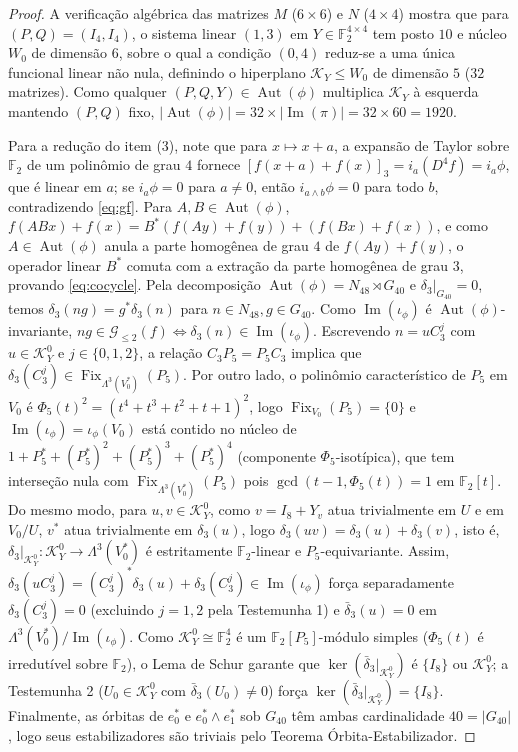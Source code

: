 \documentclass[11pt,a4paper]{article}
\theoremstyle{definition}
\theoremstyle{remark}
\newcommand{\F}{\mathbb{F}_2}
\newcommand{\Aut}{\operatorname{Aut}}
\newcommand{\Fix}{\operatorname{Fix}}
\begin{document}
\begin{proof}
A verificação algébrica das matrizes $M$ ($6\times 6$) e $N$ ($4\times 4$) mostra que para $(P,Q) = (I_4, I_4)$, o sistema linear $(1,3)$ em $Y \in \F^{4\times 4}$ tem posto $10$ e núcleo $W_0$ de dimensão $6$, sobre o qual a condição $(0,4)$ reduz-se a uma única funcional linear não nula, definindo o hiperplano $\mathcal{K}_Y \le W_0$ de dimensão $5$ ($32$ matrizes). Como qualquer $(P,Q,Y) \in \Aut(\phi)$ multiplica $\mathcal{K}_Y$ à esquerda mantendo $(P,Q)$ fixo, $|\Aut(\phi)| = 32 \times |\operatorname{Im}(\pi)| = 32 \times 60 = 1920$.

Para a redução do item (3), note que para $x \mapsto x+a$, a expansão de Taylor sobre $\F$ de um polinômio de grau $4$ fornece $[f(x+a)+f(x)]_3 = i_a(D^4 f) = i_a\phi$, que é linear em $a$; se $i_a\phi = 0$ para $a \neq 0$, então $i_{a\wedge b}\phi = 0$ para todo $b$, contradizendo \eqref{eq:gf}. Para $A,B \in \Aut(\phi)$, $f(ABx)+f(x) = B^*(f(Ay)+f(y)) + (f(Bx)+f(x))$, e como $A \in \Aut(\phi)$ anula a parte homogênea de grau $4$ de $f(Ay)+f(y)$, o operador linear $B^*$ comuta com a extração da parte homogênea de grau $3$, provando \eqref{eq:cocycle}. Pela decomposição $\Aut(\phi) = N_{48} \rtimes G_{40}$ e $\delta_3|_{G_{40}} = 0$, temos $\delta_3(n g) = g^*\delta_3(n)$ para $n \in N_{48}, g \in G_{40}$. Como $\operatorname{Im}(\iota_\phi)$ é $\Aut(\phi)$-invariante, $ng \in \mathcal{G}_{\le 2}(f) \iff \delta_3(n) \in \operatorname{Im}(\iota_\phi)$. Escrevendo $n = u C_3^j$ com $u \in \mathcal{K}_Y^0$ e $j \in \{0,1,2\}$, a relação $C_3 P_5 = P_5 C_3$ implica que $\delta_3(C_3^j) \in \Fix_{\Lambda^3(V_0^*)}(P_5)$. Por outro lado, o polinômio característico de $P_5$ em $V_0$ é $\Phi_5(t)^2 = (t^4+t^3+t^2+t+1)^2$, logo $\Fix_{V_0}(P_5) = \{0\}$ e $\operatorname{Im}(\iota_\phi) = \iota_\phi(V_0)$ está contido no núcleo de $1+P_5^*+(P_5^*)^2+(P_5^*)^3+(P_5^*)^4$ (componente $\Phi_5$-isotípica), que tem interseção nula com $\Fix_{\Lambda^3(V_0^*)}(P_5)$ pois $\gcd(t-1, \Phi_5(t)) = 1$ em $\F[t]$. Do mesmo modo, para $u,v \in \mathcal{K}_Y^0$, como $v = I_8 + Y_v$ atua trivialmente em $U$ e em $V_0/U$, $v^*$ atua trivialmente em $\delta_3(u)$, logo $\delta_3(uv) = \delta_3(u) + \delta_3(v)$, isto é, $\delta_3|_{\mathcal{K}_Y^0} : \mathcal{K}_Y^0 \to \Lambda^3(V_0^*)$ é estritamente $\F$-linear e $P_5$-equivariante. Assim, $\delta_3(u C_3^j) = (C_3^j)^*\delta_3(u) + \delta_3(C_3^j) \in \operatorname{Im}(\iota_\phi)$ força separadamente $\delta_3(C_3^j) = 0$ (excluindo $j=1,2$ pela Testemunha 1) e $\bar{\delta}_3(u) = 0$ em $\Lambda^3(V_0^*)/\operatorname{Im}(\iota_\phi)$. Como $\mathcal{K}_Y^0 \cong \F^4$ é um $\F[P_5]$-módulo simples ($\Phi_5(t)$ é irredutível sobre $\F$), o Lema de Schur garante que $\ker(\bar{\delta}_3|_{\mathcal{K}_Y^0})$ é $\{I_8\}$ ou $\mathcal{K}_Y^0$; a Testemunha 2 ($U_0 \in \mathcal{K}_Y^0$ com $\bar{\delta}_3(U_0) \neq 0$) força $\ker(\bar{\delta}_3|_{\mathcal{K}_Y^0}) = \{I_8\}$. Finalmente, as órbitas de $e_0^*$ e $e_0^*\wedge e_1^*$ sob $G_{40}$ têm ambas cardinalidade $40 = |G_{40}|$, logo seus estabilizadores são triviais pelo Teorema Órbita-Estabilizador.
\end{proof}
\end{document}
